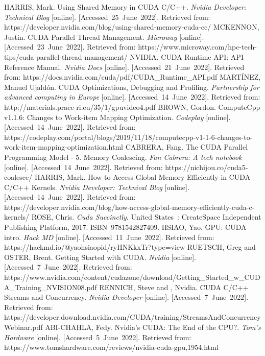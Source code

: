 \begin{thebibliography}{42}
	HARRIS, Mark. Using Shared Memory in CUDA C/C++. \textit{Nvidia Developer: Technical Blog} [online]. [Accessed 25 June 2022]. Retrieved from: https://developer.nvidia.com/blog/using-shared-memory-cuda-cc/
	MCKENNON, Justin. CUDA Parallel Thread Management. \textit{Microway} [online]. [Accessed 23 June 2022]. Retrieved from: https://www.microway.com/hpc-tech-tips/cuda-parallel-thread-management/
	NVIDIA. CUDA Runtime API: API Reference Manual. \textit{Nvidia Docs} [online]. [Accessed 21 June 2022]. Retrieved from: https://docs.nvidia.com/cuda/pdf/CUDA\_Runtime\_API.pdf
	MARTÍNEZ, Manuel Ujaldón. CUDA Optimizations, Debugging and Profiling. \textit{Partnership for advanced computing in Europe} [online]. [Accessed 14 June 2022]. Retrieved from: http://materials.prace-ri.eu/35/1/gpuvideo4.pdf
	BROWN, Gordon. ComputeCpp v1.1.6: Changes to Work-item Mapping Optimization. \textit{Codeplay} [online]. [Accessed 14 June 2022]. Retrieved from: https://codeplay.com/portal/blogs/2019/11/18/computecpp-v1-1-6-changes-to-work-item-mapping-optimization.html
	CABRERA, Fang. The CUDA Parallel Programming Model - 5. Memory Coalescing. \textit{Fan Cabrera: A tech notebook} [online]. [Accessed 14 June 2022]. Retrieved from: https://nichijou.co/cuda5-coalesce/
	HARRIS, Mark. How to Access Global Memory Efficiently in CUDA C/C++ Kernels. \textit{Nvidia Developer: Technical Blog} [online]. [Accessed 14 June 2022]. Retrieved from: https://developer.nvidia.com/blog/how-access-global-memory-efficiently-cuda-c-kernels/
	ROSE, Chris. \textit{Cuda Succinctly}. United States : CreateSpace Independent Publishing Platform, 2017. ISBN 9781542827409.
	HSIAO, Yao. GPU: CUDA intro. \textit{Hack MD} [online]. [Accessed 11 June 2022]. Retrieved from: https://hackmd.io/@yaohsiaopid/ryHNKkxTr?type=view
	RUETSCH, Greg and OSTER, Brent. Getting Started with CUDA. \textit{Nvidia} [online]. [Accessed 7 June 2022]. Retrieved from: https://www.nvidia.com/content/cudazone/download/Getting\_Started\_w\_CUDA\_Training\_NVISION08.pdf
	RENNICH, Steve and , Nvidia. CUDA C/C++ Streams and Concurrency. \textit{Nvidia Developer} [online]. [Accessed 7 June 2022]. Retrieved from: https://developer.download.nvidia.com/CUDA/training/StreamsAndConcurrencyWebinar.pdf
	ABI-CHAHLA, Fedy. Nvidia's CUDA: The End of the CPU?. \textit{Tom's Hardware} [online]. [Accessed 5 June 2022]. Retrieved from: https://www.tomshardware.com/reviews/nvidia-cuda-gpu,1954.html

\end{thebibliography}
